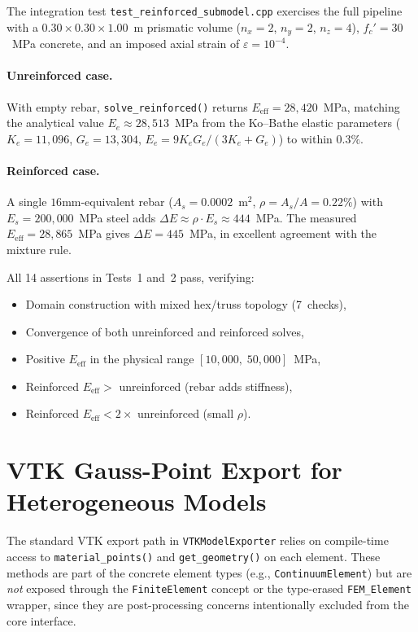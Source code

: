 The integration test \texttt{test\_reinforced\_submodel.cpp} exercises the
full pipeline with a $0.30 \times 0.30 \times 1.00$~m prismatic volume
($n_x\!=\!2$, $n_y\!=\!2$, $n_z\!=\!4$), $f_c'\!=\!30$~MPa concrete,
and an imposed axial strain of $\varepsilon = 10^{-4}$.

\paragraph{Unreinforced case.}
With empty rebar, \texttt{solve\_reinforced()} returns
$E_{\text{eff}} = 28{,}420$~MPa, matching the analytical value
$E_e \approx 28{,}513$~MPa from the Ko--Bathe elastic parameters
($K_e = 11{,}096$, $G_e = 13{,}304$,
$E_e = 9K_eG_e/(3K_e + G_e)$) to within $0.3\%$.

\paragraph{Reinforced case.}
A single $16$mm-equivalent rebar ($A_s = 0.0002$~m$^2$,
$\rho = A_s/A = 0.22\%$) with $E_s = 200{,}000$~MPa steel adds
$\Delta E \approx \rho \cdot E_s \approx 444$~MPa.  The measured
$E_{\text{eff}} = 28{,}865$~MPa gives $\Delta E = 445$~MPa, in excellent
agreement with the mixture rule.

All 14 assertions in Tests~1 and~2 pass, verifying:
\begin{itemize}
  \item Domain construction with mixed hex/truss topology (7~checks),
  \item Convergence of both unreinforced and reinforced solves,
  \item Positive $E_{\text{eff}}$ in the physical range $[10{,}000,\; 50{,}000]$~MPa,
  \item Reinforced $E_{\text{eff}} > $ unreinforced (rebar adds stiffness),
  \item Reinforced $E_{\text{eff}} < 2\times$ unreinforced (small $\rho$).
\end{itemize}


\section{VTK Gauss-Point Export for Heterogeneous Models}
\label{sec:reinf-vtk-gauss}

The standard VTK export path in \texttt{VTKModelExporter} relies on
compile-time access to \texttt{material\_points()} and
\texttt{get\_geometry()} on each element.  These methods are part of
the concrete element types (e.g., \texttt{ContinuumElement}) but are
\emph{not} exposed through the \texttt{FiniteElement} concept or the
type-erased \texttt{FEM\_Element} wrapper, since they are
post-processing concerns intentionally excluded from the core interface.

